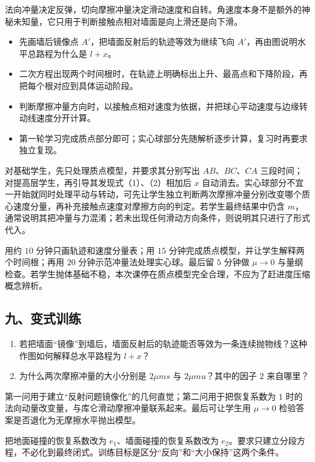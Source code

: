 \documentclass[12pt,a4paper,UTF8]{ctexart}
\newcommand{\tightlist}{\setlength{\itemsep}{0pt}\setlength{\parskip}{0pt}}
\begin{document}
法向冲量决定反弹，切向摩擦冲量决定滑动速度和自转。角速度本身不是额外的神秘未知量，它只用于判断接触点相对墙面是向上滑还是向下滑。

\begin{itemize}
\tightlist
\item
  先画墙后镜像点 \(A'\)，把墙面反射后的轨迹等效为继续飞向
  \(A'\)，再由图说明水平总路程为什么是 \(l+x\)。
\item
  二次方程出现两个时间根时，在轨迹上明确标出上升、最高点和下降阶段，再把每个根对应到具体运动阶段。
\item
  判断摩擦冲量方向时，以接触点相对速度为依据，并把球心平动速度与边缘转动线速度分开计算。
\item
  第一轮学习完成质点部分即可；实心球部分先随解析逐步计算，复习时再要求独立复现。
\end{itemize}

对基础学生，先只处理质点模型，并要求其分别写出 \(AB\)、\(BC\)、\(CA\)
三段时间；对提高层学生，再引导其发现式（1）、（2）相加后 \(x\)
自动消去。实心球部分不宜一开始就同时处理平动与转动，可先让学生独立判断两次摩擦冲量分别改变哪个质心速度分量，再补充接触点速度对摩擦方向的判定。若学生最终结果中仍含
\(m\)，通常说明其把冲量与力混淆；若未出现任何滑动方向条件，则说明其只进行了形式代入。

用约 \(10\) 分钟只画轨迹和速度分量表；用 \(15\)
分钟完成质点模型，并让学生解释两个时间根；再用 \(20\)
分钟示范冲量法处理实心球。最后留 \(5\) 分钟做 \(\mu\to0\)
与量纲检查。若学生抛体基础不稳，本次课停在质点模型完全合理，不应为了赶进度压缩概念辨析。

\subsection{九、变式训练}\label{ux4e5dux53d8ux5f0fux8badux7ec3}

\begin{enumerate}
\def\labelenumi{\arabic{enumi}.}
\tightlist
\item
  若把墙面``镜像''到墙后，墙面反射后的轨迹能否等效为一条连续抛物线？这种作图如何解释总水平路程为
  \(l+x\)？
\item
  为什么两次摩擦冲量的大小分别是 \(2\mu ms\) 与 \(2\mu m u\)？其中的因子
  \(2\) 来自哪里？
\end{enumerate}

第一问用于建立``反射问题镜像化''的几何直觉；第二问用于把恢复系数为 \(1\)
时的法向动量改变量，与库仑滑动摩擦冲量联系起来。最后可让学生用
\(\mu\to0\) 检验答案是否退化为无摩擦水平抛出模型。

把地面碰撞的恢复系数改为 \(e_1\)、墙面碰撞的恢复系数改为
\(e_2\)。要求只建立分段方程，不必化到最终闭式。训练目标是区分``反向''和``大小保持''这两个条件。
\end{document}
